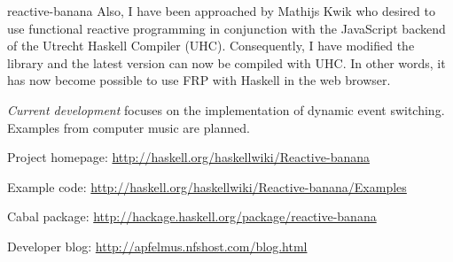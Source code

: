 \begin{hcarentry}[updated]{reactive-banana}
Also, I have been approached by Mathijs Kwik who desired to use functional reactive programming in conjunction with the JavaScript backend of the Utrecht Haskell Compiler (UHC). Consequently, I have modified the library and the latest version can now be compiled with UHC. In other words, it has now become possible to use FRP with Haskell in the web browser.

\emph{Current development} focuses on the implementation of dynamic event switching. Examples from computer music are planned.

\FurtherReading
\begin{compactitem}
\item Project homepage: \url{http://haskell.org/haskellwiki/Reactive-banana}
\item Example code: \url{http://haskell.org/haskellwiki/Reactive-banana/Examples}
\item Cabal package: \url{http://hackage.haskell.org/package/reactive-banana}
\item Developer blog:  \url{http://apfelmus.nfshost.com/blog.html}
\end{compactitem}
\end{hcarentry}
